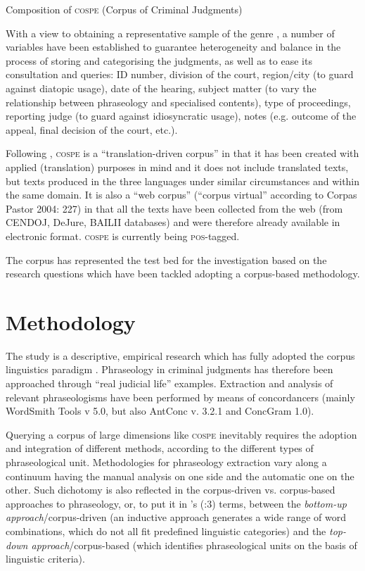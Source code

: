 \documentclass[output=paper]{LSP/langsci}
\begin{document}
\begin{table}
\caption{Composition of \textsc{cospe} (Corpus of Criminal Judgments)}
     \label{tab:6.3}
\end{table} 

With a view to obtaining a representative sample of the genre \citep[see][243]{Biber1993}, a number of variables have been established to guarantee heterogeneity and balance in the process of storing and categorising the judgments, as well as to ease its consultation and queries: ID number, division of the court, region/city (to guard against diatopic usage), date of the hearing, subject matter (to vary the relationship between phraseology and specialised contents), type of proceedings, reporting judge (to guard against idiosyncratic usage), notes (e.g. outcome of the appeal, final decision of the court, etc.).

Following \citet[105--107]{Zanettin2012}, \textsc{cospe} is a “translation-driven corpus” in that it has been created with applied (translation) purposes in mind and it does not include translated texts, but texts produced in the three languages under similar circumstances and within the same domain. It is also a “web corpus” (“corpus virtual” according to Corpas Pastor 2004: 227) in that all the texts have been collected from the web (from CENDOJ, DeJure, BAILII databases) and were therefore already available in electronic format. \textsc{cospe} is currently being \textsc{pos}-tagged.

The corpus has represented the test bed for the investigation based on the research questions which have been tackled adopting a corpus-based methodology.

\section{Methodology}
The study is a descriptive, empirical research which has fully adopted the corpus linguistics paradigm \citep[see][]{McEnery2006}. Phraseology in criminal judgments has therefore been approached through “real judicial life” examples. Extraction and analysis of relevant phraseologisms have been performed by means of concordancers (mainly WordSmith Tools v 5.0, but also AntConc v. 3.2.1 and ConcGram 1.0).

Querying a corpus of large dimensions like \textsc{cospe} inevitably requires the adoption and integration of different methods, according to the different types of phraseological unit. Methodologies for phraseology extraction vary along a continuum having the manual analysis on one side and the automatic one on the other. Such dichotomy is also reflected in the corpus-driven vs. corpus-based approaches to phraseology, or, to put it in \citeauthor{Granger2005}'s (\citeyear{Granger2005}:3) terms, between the \textit{bottom-up approach}/corpus-driven (an inductive approach generates a wide range of word combinations, which do not all fit predefined linguistic categories) and the \textit{top-down approach}/corpus-based (which identifies phraseological units on the basis of linguistic criteria).
\end{document}
